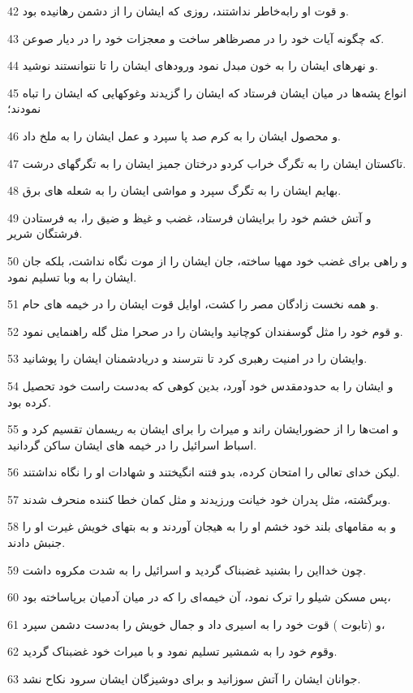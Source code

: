 \par 42 و قوت او رابه‌خاطر نداشتند، روزی که ایشان را از دشمن رهانیده بود.
\par 43 که چگونه آیات خود را در مصرظاهر ساخت و معجزات خود را در دیار صوعن.
\par 44 و نهرهای ایشان را به خون مبدل نمود ورودهای ایشان را تا نتوانستند نوشید.
\par 45 انواع پشه‌ها در میان ایشان فرستاد که ایشان را گزیدند وغوکهایی که ایشان را تباه نمودند؛
\par 46 و محصول ایشان را به کرم صد پا سپرد و عمل ایشان را به ملخ داد.
\par 47 تاکستان ایشان را به تگرگ خراب کردو درختان جمیز ایشان را به تگرگهای درشت.
\par 48 بهایم ایشان را به تگرگ سپرد و مواشی ایشان را به شعله های برق.
\par 49 و آتش خشم خود را برایشان فرستاد، غضب و غیظ و ضیق را، به فرستادن فرشتگان شریر.
\par 50 و راهی برای غضب خود مهیا ساخته، جان ایشان را از موت نگاه نداشت، بلکه جان ایشان را به وبا تسلیم نمود.
\par 51 و همه نخست زادگان مصر را کشت، اوایل قوت ایشان را در خیمه های حام.
\par 52 و قوم خود را مثل گوسفندان کوچانید وایشان را در صحرا مثل گله راهنمایی نمود.
\par 53 وایشان را در امنیت رهبری کرد تا نترسند و دریادشمنان ایشان را پوشانید.
\par 54 و ایشان را به حدودمقدس خود آورد، بدین کوهی که به‌دست راست خود تحصیل کرده بود.
\par 55 و امت‌ها را از حضورایشان راند و میراث را برای ایشان به ریسمان تقسیم کرد و اسباط اسرائیل را در خیمه های ایشان ساکن گردانید.
\par 56 لیکن خدای تعالی را امتحان کرده، بدو فتنه انگیختند و شهادات او را نگاه نداشتند.
\par 57 وبرگشته، مثل پدران خود خیانت ورزیدند و مثل کمان خطا کننده منحرف شدند.
\par 58 و به مقامهای بلند خود خشم او را به هیجان آوردند و به بتهای خویش غیرت او را جنبش دادند.
\par 59 چون خدااین را بشنید غضبناک گردید و اسرائیل را به شدت مکروه داشت.
\par 60 پس مسکن شیلو را ترک نمود، آن خیمه‌ای را که در میان آدمیان برپاساخته بود،
\par 61 و (تابوت ) قوت خود را به اسیری داد و جمال خویش را به‌دست دشمن سپرد،
\par 62 وقوم خود را به شمشیر تسلیم نمود و با میراث خود غضبناک گردید.
\par 63 جوانان ایشان را آتش سوزانید و برای دوشیزگان ایشان سرود نکاح نشد.
